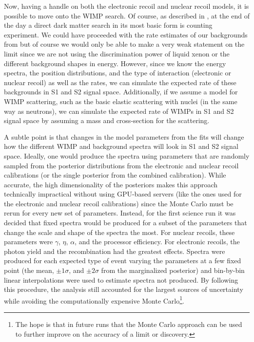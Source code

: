 Now, having a handle on both the electronic recoil and nuclear recoil models, it is possible to move onto the WIMP search.  Of course, as described in , at the end of the day a direct dark matter search in its most basic form is counting experiment.  We could have proceeded with the rate estimates of our backgrounds from  but of course we would only be able to make a very weak statement on the limit since we are not using the discrimination power of liquid xenon or the different background shapes in energy.  However, since we know the energy spectra, the position distributions, and the type of interaction (electronic or nuclear recoil) as well as the rates, we can simulate the expected rate of these backgrounds in S1 and S2 signal space.  Additionally, if we assume a model for WIMP scattering, such as the basic elastic scattering with nuclei (in the same way as neutrons), we can simulate the expected rate of WIMPs in S1 and S2 signal space by assuming a mass and cross-section for the scattering.  

A subtle point is that changes in the model parameters from the fits will change how the different WIMP and background spectra will look in S1 and S2 signal space.  Ideally, one would produce the spectra using parameters that are randomly sampled from the posterior distributions from the electronic and nuclear recoil calibrations (or the single posterior from the combined calibration).  While accurate, the high dimensionality of the posteriors makes this approach technically impractical without using GPU-based servers (like the ones used for the electronic and nuclear recoil calibrations) since the Monte Carlo must be rerun for every new set of parameters.  Instead, for the first science run it was decided that fixed spectra would be produced for a subset of the parameters that change the scale and shape of the spectra the most.  For nuclear recoils, these parameters were $\gamma$, $\eta$, $\alpha$, and the processor efficiency.  For electronic recoils, the photon yield and the recombination had the greatest effects.  Spectra were produced for each expected type of event varying the parameters at a few fixed point (the mean, $\pm 1 \sigma$, and $\pm 2 \sigma$ from the marginalized posterior) and bin-by-bin linear interpolations were used to estimate spectra not produced.  By following this procedure, the analysis still accounted for the largest sources of uncertainty while avoiding the computationally expensive Monte Carlo\footnote{The hope is that in future runs that the Monte Carlo approach can be used to further improve on the accuracy of a limit or discovery.}.

